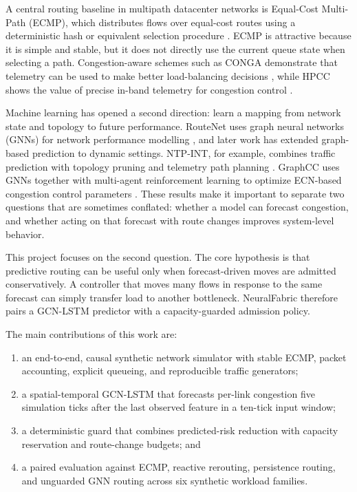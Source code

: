 \documentclass[conference]{IEEEtran}
\begin{document}
A central routing baseline in multipath datacenter networks is Equal-Cost Multi-Path (ECMP), which distributes flows over equal-cost routes using a deterministic hash or equivalent selection procedure \cite{hopps2000}. ECMP is attractive because it is simple and stable, but it does not directly use the current queue state when selecting a path. Congestion-aware schemes such as CONGA demonstrate that telemetry can be used to make better load-balancing decisions \cite{alizadeh2014conga}, while HPCC shows the value of precise in-band telemetry for congestion control \cite{li2019hpcc}.

Machine learning has opened a second direction: learn a mapping from network state and topology to future performance. RouteNet uses graph neural networks (GNNs) for network performance modelling \cite{rusek2020routenet}, and later work has extended graph-based prediction to dynamic settings. NTP-INT, for example, combines traffic prediction with topology pruning and telemetry path planning \cite{zhang2025ntpint}. GraphCC uses GNNs together with multi-agent reinforcement learning to optimize ECN-based congestion control parameters \cite{bernardez2025graphcc}. These results make it important to separate two questions that are sometimes conflated: whether a model can forecast congestion, and whether acting on that forecast with route changes improves system-level behavior.

This project focuses on the second question. The core hypothesis is that predictive routing can be useful only when forecast-driven moves are admitted conservatively. A controller that moves many flows in response to the same forecast can simply transfer load to another bottleneck. NeuralFabric therefore pairs a GCN-LSTM predictor with a capacity-guarded admission policy.

The main contributions of this work are:
\begin{enumerate}
    \item an end-to-end, causal synthetic network simulator with stable ECMP, packet accounting, explicit queueing, and reproducible traffic generators;
    \item a spatial-temporal GCN-LSTM that forecasts per-link congestion five simulation ticks after the last observed feature in a ten-tick input window;
    \item a deterministic guard that combines predicted-risk reduction with capacity reservation and route-change budgets; and
    \item a paired evaluation against ECMP, reactive rerouting, persistence routing, and unguarded GNN routing across six synthetic workload families.
\end{enumerate}
\end{document}

